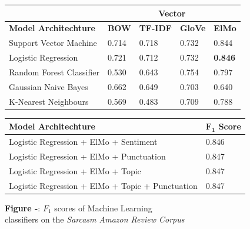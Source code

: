 \documentclass[12pt,a4paper]{article}
\begin{document}
\begin{center}
	\begin{tabular}{ |p{4.7cm}||p{1.2cm}|p{1.5cm}|p{1.2cm}|p{1.2cm}|  }
		\hline
		& \multicolumn{4}{|c|}{\textbf{Vector}} \\
		\hline
		\textbf{Model Architechture}& \textbf{BOW} & \textbf{TF-IDF} & \textbf{GloVe} & \textbf{ElMo}\\
		\hline\hline
		Support Vector Machine   & 0.714    & 0.718 &   0.732 & 0.844\\
		Logistic Regression &   0.721 & 0.712   & 0.732 & \textbf{0.846}\\
		Random Forest Classifier &0.530 & 0.643 &  0.754 & 0.797\\
		Gaussian Naive Bayes  & 0.662  & 0.649&  0.703 &0.640\\
		K-Nearest Neighbours& 0.569  & 0.483   & 0.709 & 0.788\\
		\hline
	\end{tabular}
\end{center}

\begin{center}
	\begin{tabular}{ |p{9cm}||p{2cm}|  }
		\hline
		\textbf{Model Architechture}&  \textbf{$\mathbf{F_1}$ Score}\\
		\hline\hline
		Logistic Regression + ElMo + Sentiment   & 0.846\\
		Logistic Regression + ElMo + Punctuation & 0.847\\
		Logistic Regression + ElMo + Topic   & 0.847\\
		Logistic Regression + ElMo + Topic + Punctuation   & 0.847\\
		\hline
	\end{tabular}
\end{center}



\begin{center}
	\textbf{Figure -}: $F_1$ scores of Machine Learning\\ classifiers on the \textit{Sarcasm Amazon Review Corpus}
\end{center}
\end{document}
